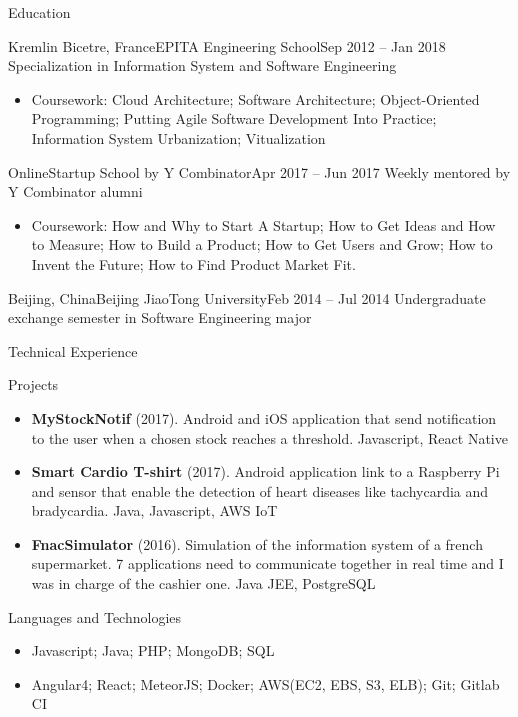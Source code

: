 \documentclass[]{mcdowellcv}
\begin{document}
	\begin{cvsection}{Education}
		\begin{cvsubsection}{Kremlin Bicetre, France}{EPITA Engineering School}{Sep 2012 -- Jan 2018}
		Specialization in Information System and Software Engineering
			\begin{itemize}
				\item Coursework: Cloud Architecture; Software Architecture; Object-Oriented Programming; Putting Agile Software Development Into Practice; Information System Urbanization; Vitualization
			\end{itemize}
		\end{cvsubsection}

		\begin{cvsubsection}{Online}{Startup School by Y Combinator}{Apr 2017 -- Jun 2017}
		Weekly mentored by Y Combinator alumni
			\begin{itemize}
				\item Coursework: How and Why to Start A Startup; How to Get Ideas and How to Measure; How to Build a Product; How to Get Users and Grow; How to Invent the Future; How to Find Product Market Fit.
			\end{itemize}
		\end{cvsubsection}
		
		\begin{cvsubsection}{Beijing, China}{Beijing JiaoTong University}{Feb 2014 -- Jul 2014}
			Undergraduate exchange semester in Software Engineering major
		\end{cvsubsection}
	\end{cvsection}
	
	\begin{cvsection}{Technical Experience}
		\begin{cvsubsection}{Projects}{}{}
			\begin{itemize}
				\item \textbf{MyStockNotif} (2017). Android and iOS application that send notification to the user when a chosen stock reaches a threshold. Javascript, React Native
				\item \textbf{Smart Cardio T-shirt} (2017). Android application link to a Raspberry Pi and sensor that enable the detection of heart diseases like tachycardia and bradycardia. Java, Javascript, AWS IoT
				\item \textbf{FnacSimulator} (2016). Simulation of the information system of a french supermarket. 7 applications need to communicate together in real time and I was in charge of the cashier one. Java JEE, PostgreSQL
			\end{itemize}
		\end{cvsubsection}
	\end{cvsection}

	\begin{cvsection}{Languages and Technologies}
		\begin{cvsubsection}{}{}{}	
			\begin{itemize}
				\item Javascript; Java; PHP; MongoDB; SQL 
				\item Angular4; React; MeteorJS; Docker; AWS(EC2, EBS, S3, ELB); Git; Gitlab CI
			\end{itemize}
		\end{cvsubsection}
	\end{cvsection}
\end{document}

